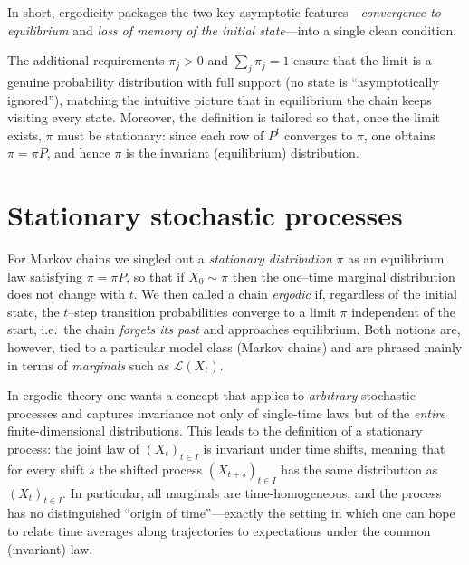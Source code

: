 In short, ergodicity packages the two key asymptotic features---\emph{convergence to equilibrium} and \emph{loss of memory of the initial state}---into a single clean condition.

\begin{remark}
    
The additional requirements $\pi_j>0$ and $\sum_{j}\pi_j=1$ ensure that the limit is a genuine probability distribution
with full support (no state is ``asymptotically ignored''), matching the intuitive picture that in equilibrium the chain
keeps visiting every state. Moreover, the definition is tailored so that, once the limit exists,
$\pi$ must be stationary: since each row of $P^t$ converges to $\pi$, one obtains $\pi=\pi P$, and hence $\pi$ is the
invariant (equilibrium) distribution. 

\end{remark}

\section{Stationary stochastic processes}

For Markov chains we singled out a \emph{stationary distribution} $\pi$ as an equilibrium law satisfying
$\pi=\pi P$, so that if $X_0\sim\pi$ then the one--time marginal distribution does not change with $t$.
We then called a chain \emph{ergodic} if, regardless of the initial state, the $t$--step transition
probabilities converge to a limit $\pi$ independent of the start, i.e.\ the chain \emph{forgets its past} and
approaches equilibrium. Both notions are, however, tied to a particular model class (Markov chains) and are phrased
mainly in terms of \emph{marginals} such as $\mathcal{L}(X_t)$. 

In ergodic theory one wants a concept that applies to
\emph{arbitrary} stochastic processes and captures invariance not only of single-time laws but of the \emph{entire}
finite-dimensional distributions. This leads to the definition of a stationary process: the joint law of
$(X_t)_{t\in I}$ is invariant under time shifts, meaning that for every shift $s$ the shifted process
$(X_{t+s})_{t\in I}$ has the same distribution as $(X_t)_{t\in I}$. In particular, all marginals are time-homogeneous,
and the process has no distinguished ``origin of time''---exactly the setting in which one can hope to relate
time averages along trajectories to expectations under the common (invariant) law.



